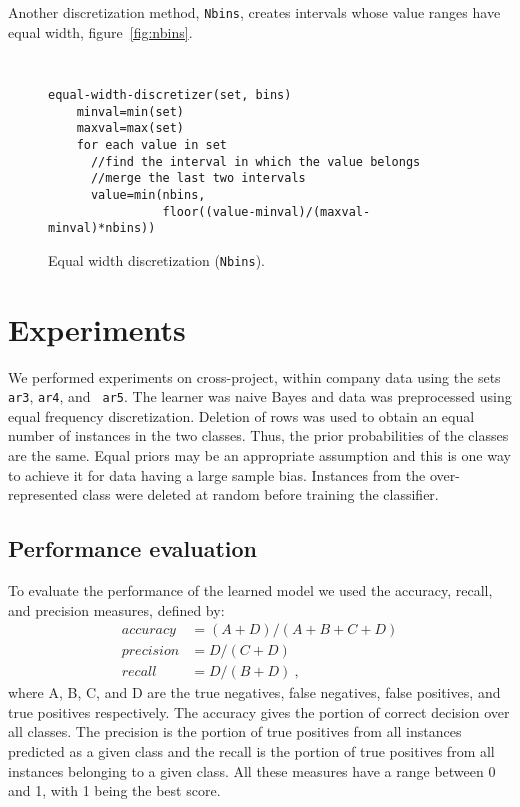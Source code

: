 \documentclass{sig-alternate}
\begin{document}
Another discretization method, {\tt Nbins}, creates intervals whose value ranges have equal width,
figure~\ref{fig:nbins}.
\begin{figure}[tbp]
\makebox[\linewidth]{\hrulefill}
{\tt\small
\begin{verbatim}
equal-width-discretizer(set, bins)
    minval=min(set)
    maxval=max(set)
    for each value in set
      //find the interval in which the value belongs
      //merge the last two intervals
      value=min(nbins,
                floor((value-minval)/(maxval-minval)*nbins))
\end{verbatim}}
\makebox[\linewidth]{\hrulefill}
\caption{Equal width discretization ({\tt Nbins}).}
\label{fig:discretization}
\end{figure}

\section{Experiments}
We performed experiments on cross-project, within company data using the sets {\tt ar3}, {\tt ar4}, and {\tt
ar5}. The learner was naive Bayes and data was preprocessed using equal frequency discretization. Deletion of
rows was used to obtain an equal number of instances in the two classes. Thus, the prior probabilities of the
classes are the same. Equal priors may be an appropriate assumption and this is one way to achieve it for data
having a large sample bias. Instances from the over-represented class were deleted at random before training
the classifier.

\subsection{Performance evaluation}
To evaluate the performance of the learned model we used the accuracy, recall, and precision measures, defined
by:
\begin{align}
accuracy &= (A+D)/(A+B+C+D) \nonumber \\
precision &= D/(C+D)\\
recall &= D/(B+D)~, \nonumber
\end{align}
where A, B, C, and D are the true negatives, false negatives, false positives, and true positives respectively. The
accuracy gives the portion of correct decision over all classes. The precision is the portion of true positives from
all instances predicted as a given class and the recall is the portion of true positives from all instances belonging
to a given class. All these measures have a range between 0 and 1, with 1 being the best score.
\end{document}
